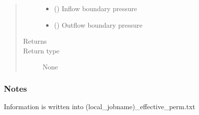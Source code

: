 \documentclass[letterpaper,10pt,english]{sphinxmanual}
\begin{document}
\begin{fulllineitems}
\begin{quote}
\begin{description}
\begin{itemize}
\item {} 
 () \textendash{} Inflow boundary pressure

\item {} 
 () \textendash{} Outflow boundary pressure

\end{itemize}

\item[{Returns}] \leavevmode


\item[{Return type}] \leavevmode
None

\end{description}\end{quote}
\subsubsection*{Notes}

Information is written into (local\_jobname)\_effective\_perm.txt

\end{fulllineitems}

\end{document}
